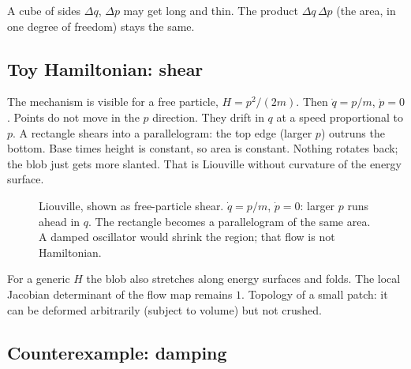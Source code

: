 \documentclass[11pt]{article}
\numberwithin{equation}{section}
\newcommand{\qdot}{\dot{q}}
\newcommand{\pdot}{\dot{p}}
\begin{document}
A cube of sides $\Delta q$, $\Delta p$ may get long and thin. The product $\Delta q\,\Delta p$ (the area, in one degree of freedom) stays the same.

\subsection{Toy Hamiltonian: shear}

The mechanism is visible for a free particle, $H=p^2/(2m)$. Then $\qdot=p/m$, $\pdot=0$. Points do not move in the $p$ direction. They drift in $q$ at a speed proportional to $p$. A rectangle shears into a parallelogram: the top edge (larger $p$) outruns the bottom. Base times height is constant, so area is constant. Nothing rotates back; the blob just gets more slanted. That is Liouville without curvature of the energy surface.

\begin{figure}[ht]
\centering
{}
\caption{Liouville, shown as free-particle shear. $\qdot=p/m$, $\pdot=0$: larger $p$ runs ahead in $q$. The rectangle becomes a parallelogram of the same area. A damped oscillator would shrink the region; that flow is not Hamiltonian.}
\end{figure}

For a generic $H$ the blob also stretches along energy surfaces and folds. The local Jacobian determinant of the flow map remains $1$. Topology of a small patch: it can be deformed arbitrarily (subject to volume) but not crushed.

\subsection{Counterexample: damping}
\end{document}
